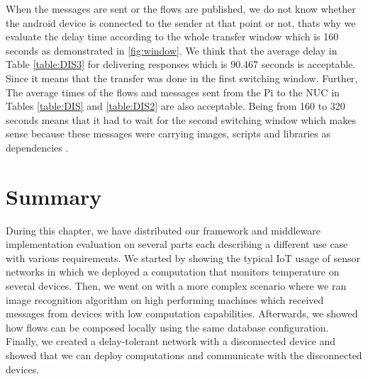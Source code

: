  \noindent When the messages are sent or the flows are published, we do not know whether the android device is connected to the sender at that point or not, thats why we evaluate the delay time according to the whole transfer window which is 160 seconds as demonstrated in \ref{fig:window}.  We think that the average delay in Table \ref{table:DIS3}  for delivering responses which is  90.467 seconds is acceptable.  Since it means that the transfer was done in the first switching window. Further, The average times  of the flows and messages sent from the Pi to the NUC in Tables  \ref{table:DIS} and \ref{table:DIS2}  are also acceptable. Being from 160 to 320 seconds means that it had to wait for the second switching window which makes sense  because these messages were carrying images, scripts and libraries as dependencies .
\section{Summary}

During this chapter, we have distributed our framework and middleware implementation evaluation on several parts each describing a different use case with various requirements. We started by showing the typical IoT usage of sensor networks in which we deployed a computation that monitors temperature on several devices.  Then, we went on with a more complex scenario where we ran image recognition algorithm on high performing machines which received messages from devices with low computation capabilities. Afterwards, we showed how flows can be composed locally using the same database configuration. Finally, we created a delay-tolerant network with a disconnected device and showed that we can deploy computations and communicate with the disconnected devices.
